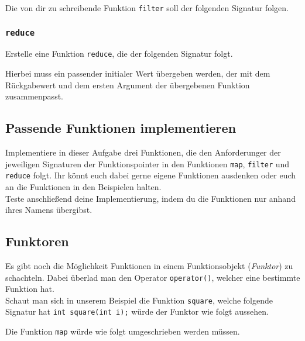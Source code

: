 Die von dir zu schreibende Funktion \lstinline{filter} soll der folgenden Signatur folgen.



\subsubsection{\lstinline{reduce}}

Erstelle eine Funktion \lstinline{reduce}, die der folgenden Signatur folgt.



Hierbei muss ein passender initialer Wert übergeben werden, der mit dem Rückgabewert und dem ersten Argument der übergebenen Funktion zusammenpasst.

\subsection{Passende Funktionen implementieren}
\label{sec:functional_impl_func}
Implementiere in dieser Aufgabe drei Funktionen, die den Anforderunger der jeweiligen Signaturen der Funktionspointer in den Funktionen \lstinline{map}, \lstinline{filter} und \lstinline{reduce} folgt.
Ihr könnt euch dabei gerne eigene Funktionen ausdenken oder euch an die Funktionen in den Beispielen halten. \\

Teste anschließend deine Implementierung, indem du die Funktionen nur anhand ihres Namens übergibst.

\subsection{Funktoren}
Es gibt noch die Möglichkeit Funktionen in einem Funktionsobjekt (\emph{Funktor}) zu schachteln.
Dabei überlad man den Operator \lstinline{operator()}, welcher eine bestimmte Funktion hat. \\

Schaut man sich in unserem Beispiel die Funktion \lstinline{square}, welche folgende Signatur hat \lstinline{int square(int i);} würde der Funktor wie folgt aussehen.



Die Funktion \lstinline{map} würde wie folgt umgeschrieben werden müssen.



